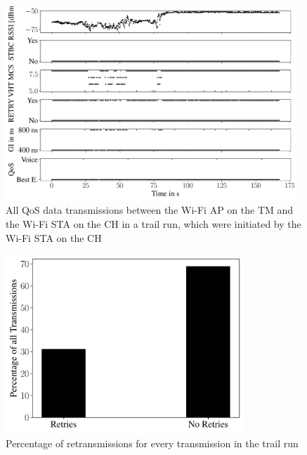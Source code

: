 \begin{figure}[H]%
	\centering
	\includegraphics[width=0.98\textwidth]{figures/wireless5_lan}
	\caption{All QoS data transmissions between the Wi-Fi \acf{AP} on the \acf{TM} and the Wi-Fi \ac{STA} on the \acf{CH} in a trail run,
	which were initiated by the Wi-Fi \ac{STA} on the \ac{CH}}
	\label{fig:trailrunNode}%
\end{figure}

\begin{figure}[H]%
	\centering
	\includegraphics[width=0.8\textwidth]{figures/All_retries}
	\caption{Percentage of retransmissions for every transmission in the trail run}
	\label{fig:retriesCount}%
\end{figure}